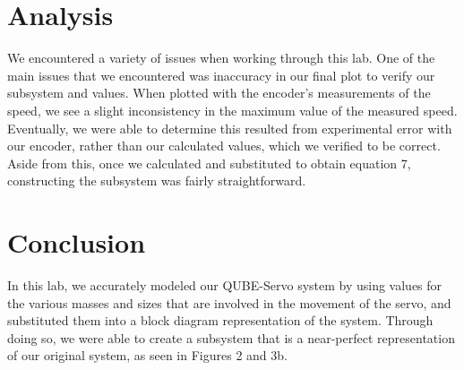 \documentclass{article}
\begin{document}
\section{Analysis}
We encountered a variety of issues when working through this lab. One of the main issues that we encountered was inaccuracy in our final plot to verify our subsystem and values. When plotted with the encoder's measurements of the speed, we see a slight inconsistency in the maximum value of the measured speed. Eventually, we were able to determine this resulted from experimental error with our encoder, rather than our calculated values, which we verified to be correct. Aside from this, once we calculated and substituted to obtain equation 7, constructing the subsystem was fairly straightforward. 

\section{Conclusion}
In this lab, we accurately modeled our QUBE-Servo system by using values for the various masses and sizes that are involved in the movement of the servo, and substituted them into a block diagram representation of the system. Through doing so, we were able to create a subsystem that is a near-perfect representation of our original system, as seen in Figures 2 and 3b.
\end{document}
